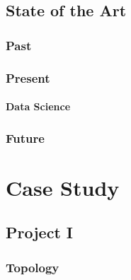 \documentclass[a4paper,11pt]{report}
\begin{document}
                \lipsum[6-8]

        \section{State of the Art}

            \lipsum[9-17]
            
            \subsection{Past}

                \lipsum[6-8]
                
            \subsection{Present}

                \lipsum[6-8]
                
                \subsubsection{Data Science}
            
                    \lipsum[6-8]
                
            \subsection{Future}

                \lipsum[6-8]
            
    \chapter{Case Study}

        \lipsum[2-10]

        \section{Project I}

            \lipsum[6-8]
            
            \subsection{Topology}

                \lipsum[6-8]
                
\end{document}
